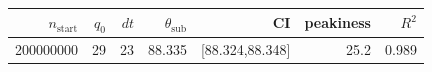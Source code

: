 \begin{tabular}{r r r r r r r}
\hline
$n_{\mathrm{start}}$ & $q_0$ & $dt$ & $\theta_{\mathrm{sub}}$ & CI & peakiness & $R^2$ \\
\hline
200000000 & 29 & 23 & 88.335 & [88.324,88.348] & 25.2 & 0.989 \\
\hline
\end{tabular}
